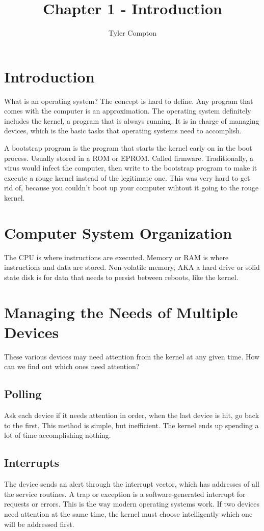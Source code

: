 \documentclass{article}
\author{Tyler Compton}
\title{Chapter 1 - Introduction}
\begin{document}
\maketitle
\tableofcontents

\section{Introduction}
What is an operating system? The concept is hard to define. Any program that
comes with the computer is an approximation. The operating system definitely
includes the kernel, a program that is always running. It is in charge of
managing devices, which is the basic tasks that operating systems need to
accomplish.

A bootstrap program is the program that starts the kernel early on in the boot
process. Usually stored in a ROM or EPROM. Called firmware. Traditionally, a
virus would infect the computer, then write to the bootstrap program to make it
execute a rouge kernel instead of the legitimate one. This was very hard to get
rid of, because you couldn't boot up your computer wihtout it going to the
rouge kernel.

\section{Computer System Organization}

The CPU is where instructions are executed. Memory or RAM is where instructions
and data are stored. Non-volatile memory, AKA a hard drive or solid state disk
is for data that needs to persist between reboots, like the kernel.

\section{Managing the Needs of Multiple Devices}
These various devices may need attention from the kernel at any given time. How
can we find out which ones need attention?

\subsection{Polling}
Ask each device if it needs attention in order, when the last device is hit, go
back to the first. This method is simple, but inefficient. The kernel ends up
spending a lot of time accomplishing nothing.

\subsection{Interrupts}
The device sends an alert through the interrupt vector, which has addresses of
all the service routines. A trap or exception is a software-generated interrupt
for requests or errors. This is the way modern operating systems work. If two
devices need attention at the same time, the kernel must choose intelligently
which one will be addressed first.
\end{document}
